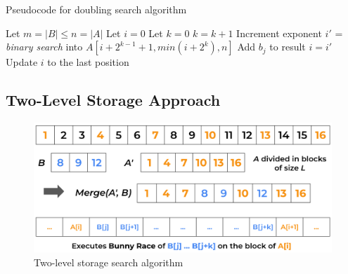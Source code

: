 \begin{algorithm}
    \captionsetup{labelsep=newline}
    \caption{Pseudocode for doubling search algorithm \label{alg:galloping}}
    \begin{algorithmic}[1]
        \State Let $m=|B| \leq n=|A|$
        \State Let $i=0$
            \State Let $k=0$
                \State $k=k+1$ \Comment Increment exponent
            \EndWhile
            \State $i'$ = \textit{binary search} into $A\left[i+2^{k-1}+1, min\left(i+2^k\right),n\right]$
                \State Add $b_j$ to result
            \EndIf
            \State $i=i'$ \Comment Update $i$ to the last position
        \EndFor
    \end{algorithmic}
\end{algorithm}

\subsection{Two-Level Storage Approach}

\begin{figure}[H] 
    \begin{center}
        \includegraphics[width=.8\textwidth]{imgs/twolevel_storage.png}
        \caption{Two-level storage search algorithm \label{fig:twolevelstorage}}
    \end{center}
\end{figure}

